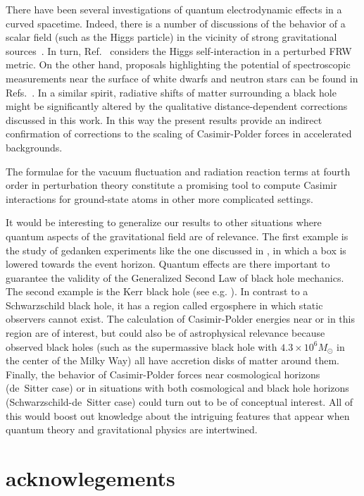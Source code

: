 \documentclass[twocolumn,prd,aps,showpacs,amsmath,amssymb]{revtex4-1}
\begin{document}
There have been several investigations of quantum electrodynamic effects in a curved spacetime. Indeed, there is a number of discussions of the behavior of a scalar field (such as the Higgs particle) in the vicinity of strong gravitational sources~\cite{onofrio1}. 
In turn, Ref.~\cite{referee} considers the Higgs self-interaction in a perturbed FRW metric. On the other hand, proposals highlighting the potential of spectroscopic measurements near the surface of white dwarfs and neutron stars can be found in Refs.~\cite{onofrio2}. In a similar spirit, radiative shifts of matter surrounding a black hole might be significantly altered by the qualitative distance-dependent corrections discussed in this work. In this way the present results provide an indirect confirmation of corrections to the scaling of Casimir-Polder forces in accelerated backgrounds.

The formulae for the vacuum fluctuation and radiation reaction terms
at fourth order in perturbation theory constitute a promising tool to compute Casimir interactions
for ground-state atoms in other more complicated settings. 

It would be interesting to generalize our results to
other situations where quantum aspects of the
gravitational field are of relevance.
The first example is the study of gedanken experiments like the one
discussed in \cite{UW82}, in which a box is lowered towards the event
horizon. Quantum effects are there important to guarantee the validity
of the Generalized Second Law of black hole mechanics.   
The second example is the Kerr black
hole (see e.g. \cite{wheeler}). In contrast to a Schwarzschild black
hole, it has a region called ergosphere in which static observers
cannot exist. The calculation of Casimir-Polder energies near or in
this region are of  interest, but could also be of astrophysical
relevance because observed black holes (such as the supermassive
black hole with $4.3 \times 10^6 M_{\odot}$ in the center of the
Milky Way) all have accretion disks of matter around them. 
Finally, the behavior of Casimir-Polder forces near cosmological
horizons (de~Sitter case) or in situations with both cosmological and black
hole horizons (Schwarzschild-de~Sitter case) \cite{GH77,FGK} 
could turn out to be of conceptual interest. All of this would boost
out knowledge about the intriguing features that appear when quantum
theory and gravitational physics are intertwined.


\section*{acknowlegements}
\end{document}
